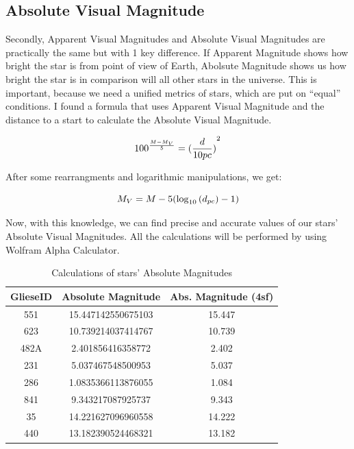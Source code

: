 \documentclass{article}
\begin{document}
  \subsection{Absolute Visual Magnitude}

  Secondly, Apparent Visual Magnitudes and Absolute Visual Magnitudes are practically the same but with 1 key difference. If Apparent Magnitude shows how bright the star is from point of view of Earth, Abolsute Magnitude shows us how bright the star is in comparison will all other stars in the universe. This is important, because we need a unified metrics of stars, which are put on ``equal'' conditions. I found a formula that uses Apparent Visual Magnitude and the distance to a start to calculate the Absolute Visual Magnitude.
  
  \begin{equation}
    {100}^{\frac{M-M_V}{5}} = {(\frac{d}{10pc})}^2\\
  \end{equation}

  After some rearrangments and logarithmic manipulations, we get:

  \begin{equation}
    M_V = M - 5(\log_{10}{(d_{pc})}-1)\\
    \end{equation}
    
  Now, with this knowledge, we can find precise and accurate values of our stars' Absolute Visual Magnitudes. All the calculations will
  be performed by using Wolfram Alpha Calculator.\\
  
\begin{table}[h!]
    \begin{center}
      \caption{Calculations of stars' Absolute Magnitudes}
      \begin{tabular}{c | c | c}
        \textbf{GlieseID} & \textbf{Absolute Magnitude} & \textbf{Abs. Magnitude (4sf)}\\
        \hline
        551  & 15.447142550675103 & 15.447\\
        623  & 10.739214037414767 & 10.739\\
        482A & 2.401856416358772  & 2.402\\
        231  & 5.037467548500953  & 5.037\\
        286  & 1.0835366113876055 & 1.084\\
        841  & 9.343217087925737  & 9.343\\
        35   & 14.221627096960558 & 14.222\\
        440  & 13.182390524468321 & 13.182\\
        
      \end{tabular}
      \label{avm}
    \end{center}
  \end{table}
  
\end{document}
